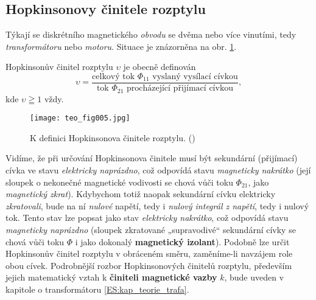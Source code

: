     \subsection{Hopkinsonovy činitele rozptylu}
      Týkají se diskrétního magnetického \emph{obvodu} se dvěma nebo více vinutími, tedy 
      \emph{transformátoru} nebo \emph{motoru}. Situace je znázorněna na obr. \ref{teo:fig005}.
      
      Hopkinsonův činitel rozptylu \(\upsilon\) je obecně definován 
      \begin{equation}  \label{TEO:eq013}
        \upsilon = \frac{\text{celkový tok \(\Phi_{11}\) vyslaný vysílací cívkou}}{\text{tok 
        \(\Phi_{21}\) procházející přijímací cívkou}},
      \end{equation}
      kde \(\upsilon\geqq1\) vždy.
      
      \begin{figure}[ht!]  %
        \centering
        \texttt{[image: teo\_fig005.jpg]}
        \caption{K definici Hopkinsonova činitele rozptylu.
                (\cite[s.~153]{Patocka4})}
        \label{teo:fig005}
      \end{figure}
      Vidíme, že při určování Hopkinsonova činitele musí být sekundární (přijímací) cívka ve stavu 
      \emph{elektricky naprázdno}, což odpovídá stavu \emph{magneticky nakrátko} (její sloupek o 
      nekonečné magnetické vodivosti se chová vůči toku \(\Phi_{21}\), jako \emph{magnetický 
      zkrat}). Kdybychom totiž naopak sekundární cívku elektricky \emph{zkratovali}, bude na ní 
      \emph{nulové} napětí, tedy i\emph{ nulový integrál z napětí}, tedy i nulový tok. Tento stav 
      lze popsat jako stav \emph{elektricky nakrátko}, což odpovídá stavu \emph{magneticky 
      naprázdno} (sloupek zkratované „supravodivé“ sekundární cívky se chová vůči toku \(\Phi\) i 
      jako dokonalý \textbf{magnetický izolant}). Podobně lze určit Hopkinsonův činitel rozptylu v 
      obráceném směru, zaměníme-li navzájem role obou cívek. Podrobnější rozbor Hopkinsonových 
      činitelů rozptylu, především jejich matematický vztah k \textbf{činiteli magnetické vazby} 
      \(k\), bude uveden v kapitole o transformátoru \ref{ES:kap_teorie_trafa}.
       
